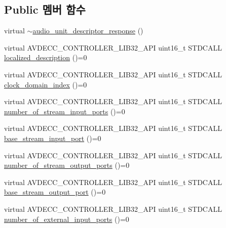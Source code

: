 \subsection*{Public 멤버 함수}
\begin{DoxyCompactItemize}
\item 
virtual \hyperlink{classavdecc__lib_1_1audio__unit__descriptor__response_a3074cc637993b72337ecdd4a8b79675d}{$\sim$audio\+\_\+unit\+\_\+descriptor\+\_\+response} ()
\item 
virtual A\+V\+D\+E\+C\+C\+\_\+\+C\+O\+N\+T\+R\+O\+L\+L\+E\+R\+\_\+\+L\+I\+B32\+\_\+\+A\+PI uint16\+\_\+t S\+T\+D\+C\+A\+LL \hyperlink{classavdecc__lib_1_1audio__unit__descriptor__response_a1fb9de45567df344090a1407aa6b775f}{localized\+\_\+description} ()=0
\item 
virtual A\+V\+D\+E\+C\+C\+\_\+\+C\+O\+N\+T\+R\+O\+L\+L\+E\+R\+\_\+\+L\+I\+B32\+\_\+\+A\+PI uint16\+\_\+t S\+T\+D\+C\+A\+LL \hyperlink{classavdecc__lib_1_1audio__unit__descriptor__response_aab7f93d403d8b73f8f4a8fb7c61ecded}{clock\+\_\+domain\+\_\+index} ()=0
\item 
virtual A\+V\+D\+E\+C\+C\+\_\+\+C\+O\+N\+T\+R\+O\+L\+L\+E\+R\+\_\+\+L\+I\+B32\+\_\+\+A\+PI uint16\+\_\+t S\+T\+D\+C\+A\+LL \hyperlink{classavdecc__lib_1_1audio__unit__descriptor__response_aa99346300c900eeffea74a9a97beefef}{number\+\_\+of\+\_\+stream\+\_\+input\+\_\+ports} ()=0
\item 
virtual A\+V\+D\+E\+C\+C\+\_\+\+C\+O\+N\+T\+R\+O\+L\+L\+E\+R\+\_\+\+L\+I\+B32\+\_\+\+A\+PI uint16\+\_\+t S\+T\+D\+C\+A\+LL \hyperlink{classavdecc__lib_1_1audio__unit__descriptor__response_ae4188101b1f0ecc73df7762e9255c074}{base\+\_\+stream\+\_\+input\+\_\+port} ()=0
\item 
virtual A\+V\+D\+E\+C\+C\+\_\+\+C\+O\+N\+T\+R\+O\+L\+L\+E\+R\+\_\+\+L\+I\+B32\+\_\+\+A\+PI uint16\+\_\+t S\+T\+D\+C\+A\+LL \hyperlink{classavdecc__lib_1_1audio__unit__descriptor__response_a14e1ea13bc7442fb1e4f3443babacf84}{number\+\_\+of\+\_\+stream\+\_\+output\+\_\+ports} ()=0
\item 
virtual A\+V\+D\+E\+C\+C\+\_\+\+C\+O\+N\+T\+R\+O\+L\+L\+E\+R\+\_\+\+L\+I\+B32\+\_\+\+A\+PI uint16\+\_\+t S\+T\+D\+C\+A\+LL \hyperlink{classavdecc__lib_1_1audio__unit__descriptor__response_a868aa2764440282347aea09c5a09cbb8}{base\+\_\+stream\+\_\+output\+\_\+port} ()=0
\item 
virtual A\+V\+D\+E\+C\+C\+\_\+\+C\+O\+N\+T\+R\+O\+L\+L\+E\+R\+\_\+\+L\+I\+B32\+\_\+\+A\+PI uint16\+\_\+t S\+T\+D\+C\+A\+LL \hyperlink{classavdecc__lib_1_1audio__unit__descriptor__response_a6f110a2b5251cae78053f519e9b03084}{number\+\_\+of\+\_\+external\+\_\+input\+\_\+ports} ()=0

\end{DoxyCompactItemize}
